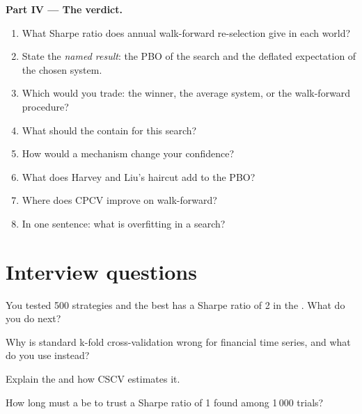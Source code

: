 \begin{problem}
\medskip\noindent\textbf{Part IV --- The verdict.}
\begin{enumerate}[resume]
\item What Sharpe ratio does annual walk-forward re-selection give in each world?
\item State the \emph{named result}: the PBO of the search and the deflated  expectation of the chosen system.
\item Which would you trade: the  winner, the average system, or the walk-forward procedure?
\item What should the  contain for this search?
\item How would a mechanism change your confidence?
\item What does Harvey and Liu's haircut add to the PBO?
\item Where does CPCV improve on walk-forward?
\item In one sentence: what is overfitting in a  search?
\end{enumerate}
\end{problem}

\section{Interview questions}

\begin{interviewq}\label{iq:rs:overfitting:1}
You tested 500 strategies and the best has a Sharpe ratio of 2 in the . What do you do next?
\end{interviewq}

\begin{interviewq}\label{iq:rs:overfitting:2}
Why is standard k-fold cross-validation wrong for financial time series, and what do you use instead?
\end{interviewq}

\begin{interviewq}\label{iq:rs:overfitting:3}
Explain the  and how CSCV estimates it.
\end{interviewq}

\begin{interviewq}\label{iq:rs:overfitting:4}
How long must a  be to trust a Sharpe ratio of 1 found among 1\,000 trials?
\end{interviewq}

